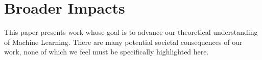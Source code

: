 \section{Broader Impacts}
This paper presents work whose goal is to advance our theoretical understanding of Machine Learning. There are many potential societal consequences of our work, none of which we feel must be specifically highlighted here.